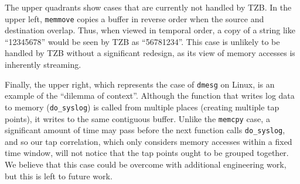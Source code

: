 The upper quadrants show cases that are currently not handled by TZB. In
the upper left, \texttt{memmove} copies a buffer in reverse order when
the source and destination overlap. Thus, when viewed in temporal order,
a copy of a string like ``12345678'' would be seen by TZB as
``56781234''. This case is unlikely to be handled by TZB without a
significant redesign, as its view of memory accesses is inherently
streaming.

Finally, the upper right, which represents the case of \texttt{dmesg} on
Linux, is an example of the ``dilemma of context''. Although the
function that writes log data to memory (\texttt{do\_syslog}) is called
from multiple places (creating multiple tap points), it writes to the
same contiguous buffer. Unlike the \texttt{memcpy} case, a significant
amount of time may pass before the next function calls
\texttt{do\_syslog}, and so our tap correlation, which only considers
memory accesses within a fixed time window, will not notice that the tap
points ought to be grouped together. We believe that this case could be
overcome with additional engineering work, but this is left to future
work.
